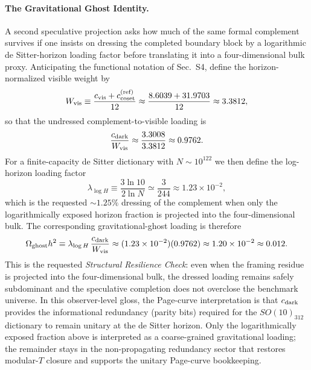 \documentclass[11pt]{article}
\begin{document}
\paragraph{The Gravitational Ghost Identity.} A second speculative projection asks how much of the same formal complement survives if one insists on dressing the completed boundary block by a logarithmic de Sitter-horizon loading factor before translating it into a four-dimensional bulk proxy. Anticipating the functional notation of Sec.~S4, define the horizon-normalized visible weight by
\begin{equation}
 W_{\rm vis}
 \equiv
 \frac{c_{\rm vis}+c_{\rm coset}^{\rm(ref)}}{12}
 \approx
 \frac{8.6039+31.9703}{12}
 \approx
 3.3812,
\end{equation}
so that the undressed complement-to-visible loading is
\begin{equation}
 \frac{c_{\rm dark}}{W_{\rm vis}}
 \approx
 \frac{3.3008}{3.3812}
 \approx
 0.9762.
\end{equation}
For a finite-capacity de Sitter dictionary with $N\sim10^{122}$ we then define the log-horizon loading factor
\begin{equation}
 \lambda_{\log H}
 \equiv
 \frac{3\ln 10}{2\ln N}
 \simeq
 \frac{3}{244}
 \approx
 1.23\times10^{-2},
\end{equation}
which is the requested $\sim1.25\%$ dressing of the complement when only the logarithmically exposed horizon fraction is projected into the four-dimensional bulk. The corresponding gravitational-ghost loading is therefore
\begin{equation}
 \Omega_{\rm ghost}h^2
 \equiv
 \lambda_{\log H}\,\frac{c_{\rm dark}}{W_{\rm vis}}
 \approx
 (1.23\times10^{-2})(0.9762)
 \approx
 1.20\times10^{-2}
 \approx
 0.012.
\end{equation}
This is the requested \emph{Structural Resilience Check}: even when the framing residue is projected into the four-dimensional bulk, the dressed loading remains safely subdominant and the speculative completion does not overclose the benchmark universe. In this observer-level gloss, the Page-curve interpretation is that $c_{\rm dark}$ provides the informational redundancy (parity bits) required for the $SO(10)_{312}$ dictionary to remain unitary at the de Sitter horizon. Only the logarithmically exposed fraction above is interpreted as a coarse-grained gravitational loading; the remainder stays in the non-propagating redundancy sector that restores modular-$T$ closure and supports the unitary Page-curve bookkeeping.
\end{document}

